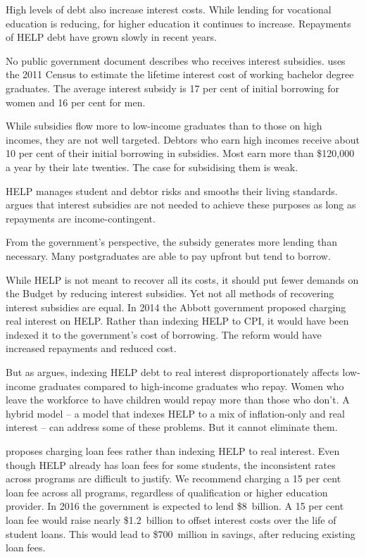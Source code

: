 \documentclass[embargoed]{grattan}
\begin{document}
High levels of debt also increase interest costs.
While lending for vocational education is reducing, for higher education it continues to increase.
Repayments of \gls{HELP} debt have grown slowly in recent years.

No public government document describes who receives interest subsidies.
 uses the 2011 Census to estimate the lifetime interest cost of working bachelor degree graduates.
The average interest subsidy is 17 per cent of initial borrowing for women and 16 per cent for men.

While subsidies flow more to low-income graduates than to those on high incomes, they are not well targeted.
Debtors who earn high incomes receive about 10 per cent of their initial borrowing in subsidies.
Most earn more than \$120,000 a year by their late twenties.
The case for subsidising them is weak.

\gls{HELP} manages student and debtor risks and smooths their living standards.
 argues that interest subsidies are not needed to achieve these purposes as long as repayments are income-contingent.

From the government's perspective, the subsidy generates more lending than necessary.
Many postgraduates are able to pay upfront but tend to borrow.

While \gls{HELP} is not meant to recover all its costs, it should put fewer demands on the Budget by reducing interest subsidies.
Yet not all methods of recovering interest subsidies are equal.
In 2014 the Abbott government proposed charging real interest on \gls{HELP}.
Rather than indexing \gls{HELP} to \gls{CPI}, it would have been indexed it to the government's cost of borrowing.
The reform would have increased repayments and reduced cost.

But as  argues, indexing \gls{HELP} debt to real interest disproportionately affects low-income graduates compared to high-income graduates who repay.
Women who leave the workforce to have children would repay more than those who don't.
A hybrid model -- a model that indexes \gls{HELP} to a mix of inflation-only and real interest -- can address some of these problems.
But it cannot eliminate them.

 proposes charging loan fees rather than indexing \gls{HELP} to real interest.
Even though \gls{HELP} already has loan fees for some students, the inconsistent rates across programs are difficult to justify.
We recommend charging a 15 per cent loan fee across all programs, regardless of qualification or higher education provider.
In 2016 the government is expected to lend \$8~billion.
A 15 per cent loan fee would raise nearly \$1.2~billion to offset interest costs over the life of student loans.
This would lead to \$700~million in savings, after reducing existing loan fees.
\end{document}
